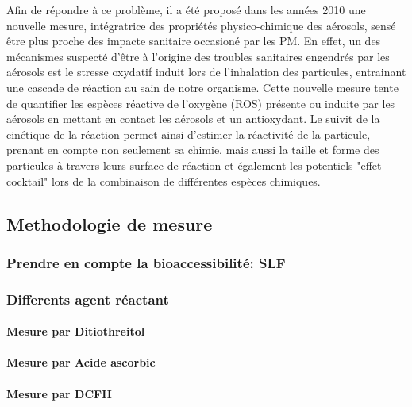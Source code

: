 Afin de répondre à ce problème, il a été proposé dans les années 2010 une nouvelle mesure,
intégratrice des propriétés physico-chimique des aérosols, sensé être plus proche des
impacte sanitaire occasioné par les PM. En effet, un des mécanismes suspecté d'être à
l'origine des troubles sanitaires engendrés par les aérosols est le stresse oxydatif
induit lors de l'inhalation des particules, entrainant une cascade de réaction au sain de
notre organisme.
Cette nouvelle mesure tente de quantifier les espèces réactive de l'oxygène (ROS) présente
ou induite par les aérosols en mettant en contact les aérosols et un antioxydant.
Le suivit de la cinétique de la réaction permet ainsi d'estimer la réactivité de la
particule, prenant en compte non seulement sa chimie, mais aussi la taille et forme des
particules à travers leurs surface de réaction et également les potentiels "effet
cocktail" lors de la combinaison de différentes espèces chimiques.

\subsection{Methodologie de mesure}%
\label{sub:methodologie_de_mesure}

\subsubsection{Prendre en compte la bioaccessibilité: SLF}%
\label{sub:prendre_en_compte_la_bioaccessibilite_slf}

\subsubsection{Differents agent réactant}%
\label{ssub:differents_agent_reactant}

\paragraph{Mesure par Ditiothreitol}%
\label{ssub:mesure_par_ditiothreitol}

\paragraph{Mesure par Acide ascorbic}%
\label{ssub:mesure_par_acide_ascorbic}

\paragraph{Mesure par DCFH}%
\label{ssub:mesure_par_dcfh}

